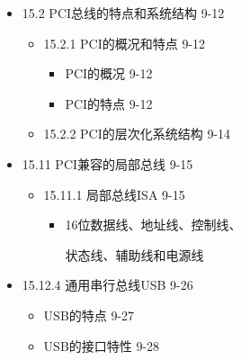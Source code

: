 \documentclass[zihao=5,linespread=1,heading=false,autoindent=0pt]{ctexart}
\newenvironment{citemize}%
{\begin{itemize}[parsep=0pt,itemsep=0pt,topsep=0pt,partopsep=0pt,labelwidth=1em,leftmargin=*]}
{\end{itemize}}
\theoremstyle{exampstyle} \newtheorem{definition}{定义}[section]
\theoremstyle{exampstyle} \newtheorem{example}{例}[section]
\theoremstyle{exampstyle} \newtheorem{theorem}{定理}[section]
\theoremstyle{exampstyle} \newtheorem{lemma}{引理}[section]
\theoremstyle{exampstyle} \newtheorem{myproof}{证明}[section]
\begin{document}
\begin{multicols*}{3}
\begin{citemize}
\begin{citemize}
        \begin{citemize}
         
        \item
          宽度、总线频率、传输率
        \end{citemize}
      \item
        多总线技术 9-6
      \item
        总线的层次 9-7
      \item
        总线桥 9-8
      \item
        基于PC/XT总线的微机的基本结构 9-9
      \item
        基于ISA总线的微机的基本结构 9-10
      \item
        基于PCI总线的微机的基本结构 9-11
      \end{citemize}
    \item
      15.2 PCI总线的特点和系统结构 9-12
    
      \begin{citemize}
       
      \item
        15.2.1 PCI的概况和特点 9-12
    
        \begin{citemize}
         
        \item
          PCI的概况 9-12
        \item
          PCI的特点 9-12
        \end{citemize}
      \item
        15.2.2 PCI的层次化系统结构 9-14
      \end{citemize}
    \item
      15.11 PCI兼容的局部总线 9-15
    
      \begin{citemize}
      \item
        15.11.1 局部总线ISA 9-15
    
        \begin{citemize}
        \item
          16位数据线、地址线、控制线、
    
          状态线、辅助线和电源线
        \end{citemize}
      \end{citemize}
    \item
      15.12.4 通用串行总线USB 9-26
    
      \begin{citemize}
       
      \item
        USB的特点 9-27
      \item
        USB的接口特性 9-28
      \end{citemize}
    \end{citemize}
\end{multicols*}
\end{document}
